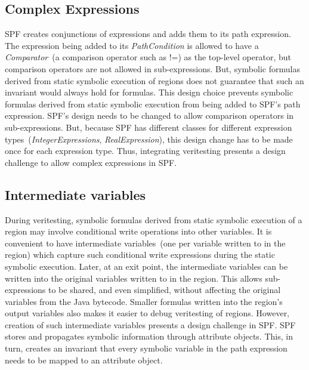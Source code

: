 \subsection{Complex Expressions}
SPF creates conjunctions of expressions and adds them to its path expression.
%
The expression being added to its \textit{PathCondition} is allowed to have a \textit{Comparator}~(a comparison operator such as !=) as the top-level operator, but comparison operators are not allowed in sub-expressions.
%
But, symbolic formulas derived from static symbolic execution of regions does not guarantee that such an invariant would always hold for formulas.
%
This design choice prevents symbolic formulas derived from static symbolic execution from being added to SPF\rq s path expression.
%
SPF\rq s design needs to be changed to allow comparison operators in sub-expressions.
%
But, because SPF has different classes for different expression types~(\textit{IntegerExpressions}, \textit{RealExpression}), this design change has to be made once for each expression type.
%
Thus, integrating veritesting presents a design challenge to allow complex expressions in SPF.

\subsection{Intermediate variables}
%
During veritesting, symbolic formulas derived from static symbolic execution of a region may involve conditional write operations into other variables.
%
It is convenient to have intermediate variables~(one per variable written to in the region) which capture such conditional write expressions during the static symbolic execution.
%
Later, at an exit point, the intermediate variables can be written into the original variables written to in the region.
%
This allows sub-expressions to be shared, and even simplified, without affecting the original variables from the Java bytecode.
%
Smaller formulas written into the region\rq s output variables also makes it easier to debug veritesting of regions.
%
However, creation of such intermediate variables presents a design challenge in SPF.
%
SPF stores and propagates symbolic information through attribute objects.
%
This, in turn, creates an invariant that every symbolic variable in the path expression needs to be mapped to an attribute object.

